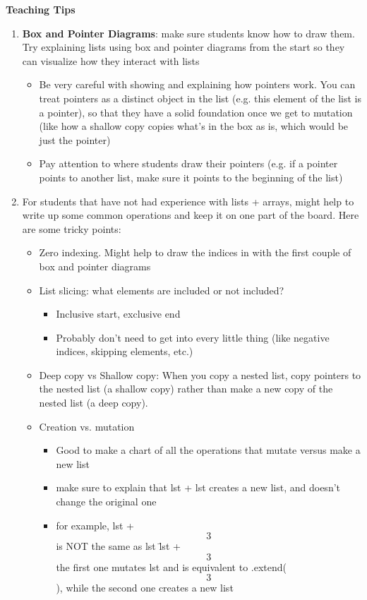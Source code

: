 \begin{blocksection}
	\begin{guide}
	\textbf{Teaching Tips}
	\begin{enumerate}
			\item \textbf{Box and Pointer Diagrams}: make sure students know how to draw them. Try explaining lists using box and pointer diagrams from the start so they can visualize how they interact with lists
			\begin{itemize}
				\item Be very careful with showing and explaining how pointers work. You can treat pointers as a distinct object in the list (e.g. this element of the list is a pointer), so that they have a solid foundation once we get to mutation (like how a shallow copy copies what’s in the box as is, which would be just the pointer)
				\item Pay attention to where students draw their pointers (e.g. if a pointer points to another list, make sure it points to the beginning of the list)
			\end{itemize}
			\item For students that have not had experience with lists + arrays, might help to write up some common operations and keep it on one part of the board. Here are some tricky points:
			\begin{itemize}
				\item Zero indexing. Might help to draw the indices in with the first couple of box and pointer diagrams
				\item List slicing: what elements are included or not included?
				\begin{itemize}
					\item Inclusive start, exclusive end
					\item Probably don’t need to get into every little thing (like negative indices, skipping elements, etc.) 
				\end{itemize}
				\item Deep copy vs Shallow copy: When you copy a nested list, copy pointers to the nested list (a shallow copy)  rather than make a new copy of the nested list (a deep copy).
				\item Creation vs. mutation
				\begin{itemize}
					\item Good to make a chart of all the operations that mutate versus make a new list
					\item make sure to explain that lst + lst creates a new list, and doesn’t change the original one
					\item for example, lst +\= \[3\] is NOT the same as lst \= lst + \[3\]
					the first one mutates lst and is equivalent to .extend(\[3\]), while the second one creates a new list
				\end{itemize}
			\end{itemize}
	\end{enumerate}
	\end{guide}
\end{blocksection}
